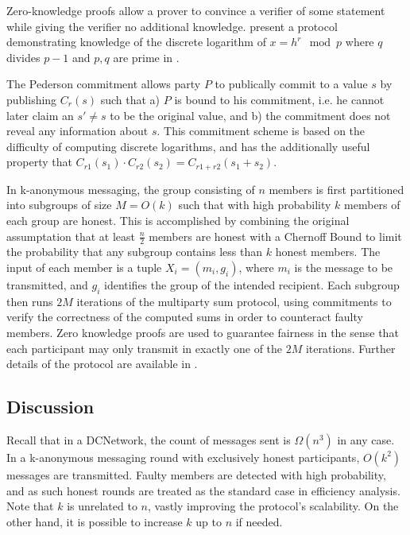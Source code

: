 Zero-knowledge proofs allow a prover to convince a verifier of some statement while
giving the verifier no additional knowledge. \citeauthor{chaum1987demonstrating}
present a protocol demonstrating knowledge of the discrete logarithm of $x = h^r \mod p$
where $q$ divides $p - 1$ and $p,q$ are prime in \cite{chaum1987demonstrating}.

The Pederson commitment \cite{pedersen1992non} allows party $P$ to publically commit
to a value $s$ by publishing $C_r(s)$ such that a) $P$ is bound to his commitment, i.e. he cannot later
claim an $s' \neq s$ to be the original value, and b) the commitment does not reveal
any information about $s$. This commitment scheme is based on the difficulty of computing discrete
logarithms, and has the additionally useful property that $C_{r1}(s_1) \cdot C_{r2}(s_2) = C_{r1 + r2}(s_1 + s_2)$.

In k-anonymous messaging, the group consisting of $n$ members is first partitioned
into subgroups of size $M = O(k)$ such that with high probability $k$ members of each group
are honest. This is accomplished by combining the original assumptation that at least
$\frac{n}{2}$ members are honest with a Chernoff Bound to limit the probability that
any subgroup contains less than $k$ honest members. The input of each member is
a tuple $X_i = (m_i, g_i)$, where $m_i$ is the message to be transmitted, and
$g_i$ identifies the group of the intended recipient. Each subgroup then runs
$2M$ iterations of the multiparty sum protocol, using commitments to verify the
correctness of the computed sums in order to counteract faulty members. Zero knowledge
proofs are used to guarantee fairness in the sense that each participant may only transmit
in exactly one of the $2M$ iterations. Further details of the protocol are available in
\cite{von2003k}.

\subsection{Discussion}

Recall that in a \ac{DCNetwork}, the count of messages sent is $\Omega(n^3)$ in any case.
In a k-anonymous messaging round with exclusively honest participants, $O(k^2)$ messages are transmitted.
Faulty members are detected with high probability, and as such
honest rounds are treated as the standard case in efficiency analysis.
Note that $k$ is unrelated to $n$, vastly improving the protocol's scalability.
On the other hand, it is possible to increase $k$ up to $n$ if needed.

